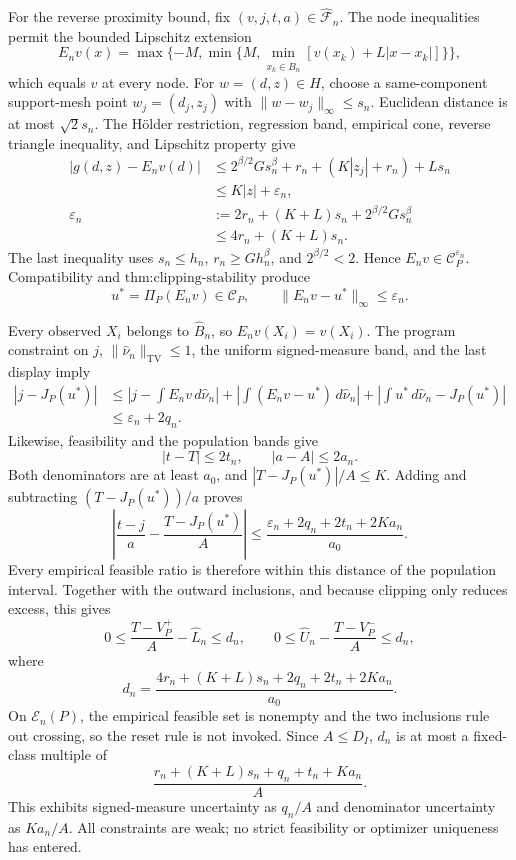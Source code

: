 For the reverse proximity bound, fix \((v,j,t,a)\in\widehat{\mathscr F}_n\).  The node inequalities permit the bounded Lipschitz extension
\[
 E_nv(x)=\max\{-M,\min\{M,\min_{x_k\in\widehat B_n}[v(x_k)+L|x-x_k|]\}\},
\]
which equals \(v\) at every node.  For \(w=(d,z)\in H\), choose a same-component support-mesh point \(w_j=(d_j,z_j)\) with \(\|w-w_j\|_\infty\leq s_n\).  Euclidean distance is at most \(\sqrt2s_n\).  The H\"older restriction, regression band, empirical cone, reverse triangle inequality, and Lipschitz property give
\[
 \begin{aligned}
 |g(d,z)-E_nv(d)|
 &\leq2^{\beta/2}Gs_n^\beta+r_n+(K|z_j|+r_n)+Ls_n\\
 &\leq K|z|+\varepsilon_n,\\
 \varepsilon_n&:=2r_n+(K+L)s_n+2^{\beta/2}Gs_n^\beta\\
 &\leq4r_n+(K+L)s_n.
 \end{aligned}
\]
The last inequality uses \(s_n\leq h_n\), \(r_n\geq Gh_n^\beta\), and \(2^{\beta/2}<2\).  Hence \(E_nv\in\mathcal C_P^{\varepsilon_n}\).  Compatibility and \(\text{thm:clipping-stability}\) produce
\[
 u^*=\Pi_P(E_nv)\in\mathcal C_P,
 \qquad
 \|E_nv-u^*\|_\infty\leq\varepsilon_n.
\]

Every observed \(X_i\) belongs to \(\widehat B_n\), so \(E_nv(X_i)=v(X_i)\).  The program constraint on \(j\), \(\|\widehat\nu_n\|_{\mathrm{TV}}\leq1\), the uniform signed-measure band, and the last display imply
\[
 \begin{aligned}
 |j-J_P(u^*)|
 &\leq\left|j-\int E_nv\,d\widehat\nu_n\right|
 +\left|\int(E_nv-u^*)\,d\widehat\nu_n\right|
 +\left|\int u^*\,d\widehat\nu_n-J_P(u^*)\right|\\
 &\leq\varepsilon_n+2q_n.
 \end{aligned}
\]
Likewise, feasibility and the population bands give
\[
 |t-T|\leq2t_n,
 \qquad
 |a-A|\leq2a_n.
\]
Both denominators are at least \(a_0\), and \(|T-J_P(u^*)|/A\leq K\).  Adding and subtracting \((T-J_P(u^*))/a\) proves
\[
 \left|\frac{t-j}{a}-\frac{T-J_P(u^*)}{A}\right|
 \leq\frac{\varepsilon_n+2q_n+2t_n+2Ka_n}{a_0}.
\]
Every empirical feasible ratio is therefore within this distance of the population interval.  Together with the outward inclusions, and because clipping only reduces excess, this gives
\[
 0\leq\frac{T-V_P^+}{A}-\widehat L_n\leq d_n,
 \qquad
 0\leq\widehat U_n-\frac{T-V_P^-}{A}\leq d_n,
\]
where
\[
 d_n=\frac{4r_n+(K+L)s_n+2q_n+2t_n+2Ka_n}{a_0}.
\]
On \(\mathcal E_n(P)\), the empirical feasible set is nonempty and the two inclusions rule out crossing, so the reset rule is not invoked.  Since \(A\leq D_I\), \(d_n\) is at most a fixed-class multiple of
\[
 \frac{r_n+(K+L)s_n+q_n+t_n+Ka_n}{A}.
\]
This exhibits signed-measure uncertainty as \(q_n/A\) and denominator uncertainty as \(Ka_n/A\).  All constraints are weak; no strict feasibility or optimizer uniqueness has entered.

